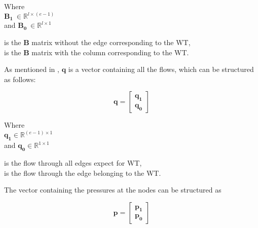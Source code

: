 \begin{minipage}[t]{0.24\textwidth}
Where\\
\hspace*{8mm} $\bm{B_1} \: \in \mathbb{R}^{l \times (e-1)}$  \\
and \hspace*{0.4mm} $\bm{B_0} \: \in \mathbb{R}^{l \times 1} $ 
\end{minipage}
\begin{minipage}[t]{0.70\textwidth}
\vspace*{2mm}
\hspace*{4mm} is the $\bm{B}$ matrix without the edge corresponding to the WT,\\
\hspace*{4mm} is the $\bm{B}$ matrix with the column corresponding to the WT.
\end{minipage}

As mentioned in , $\bm{q}$ is a vector containing all the flows, which can be structured as follows:

\begin{equation}
\bm{q} =
\begin{bmatrix}
         \bm{q_1} \\
	\bm{q_0} 
\end{bmatrix}
\label{qmatrix}
\end{equation}

\begin{minipage}[t]{0.24\textwidth}
Where\\
\hspace*{8mm} $\bm{q_1} \in \mathbb{R}^{(e-1) \times 1}$  \\
and \hspace*{0.7mm} $\bm{q_0} \in \mathbb{R}^{1 \times 1} $ 
\end{minipage}
\begin{minipage}[t]{0.68\textwidth}
\vspace*{2mm}
\hspace*{4mm} is the flow through all edges expect for WT,\\
\hspace*{4mm} is the flow through the edge belonging to the WT. 
\end{minipage}

The vector containing the pressures at the nodes can be structured as

\begin{equation}
\bm{p} =
\begin{bmatrix}
         \bm{p_1} \\
	\bm{p_0} 
\end{bmatrix}
\end{equation}

